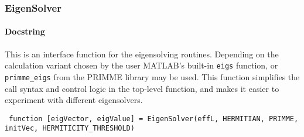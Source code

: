  \subsubsection{EigenSolver}
 \paragraph{Docstring} This is an interface function for the eigensolving routines. Depending on the calculation variant chosen by the user MATLAB's built-in \lstinline$eigs$ function, or \lstinline$primme_eigs$ from the PRIMME library may be used. This function simplifies the call syntax and control logic in the top-level function, and makes it easier to experiment with different eigensolvers.
 \begin{lstlisting}
 function [eigVector, eigValue] = EigenSolver(effL, HERMITIAN, PRIMME, initVec, HERMITICITY_THRESHOLD) \end{lstlisting}
